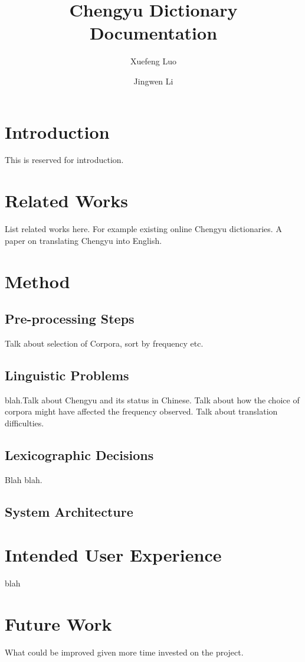 \documentclass[11pt]{article} %
\title{Chengyu Dictionary Documentation} %
\author{Xuefeng Luo \and Jingwen Li}
\date{}	%
\begin{document}
\maketitle

\section{Introduction}
\indent This is reserved for introduction.

\section{Related Works}
\indent List related works here. For example existing online Chengyu dictionaries. A paper on translating Chengyu into English.

\section{Method}
\subsection{Pre-processing Steps}
\indent Talk about selection of Corpora, sort by frequency etc.\\

\subsection{Linguistic Problems}

\indent blah.Talk about Chengyu and its status in Chinese. Talk about how the choice of corpora might have affected the frequency observed. Talk about translation difficulties.\\

\subsection{Lexicographic Decisions}

\indent Blah blah.\\

\subsection{System Architecture}

\section{Intended User Experience}

\indent blah\\

\section{Future Work}

\indent What could be improved given more time invested on the project. 





\end{document}
